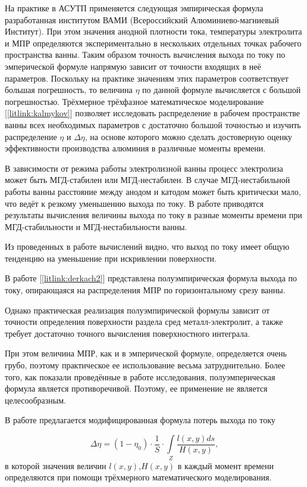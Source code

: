 \documentclass{article}
\begin{document}
На практике в АСУТП применяется следующая эмпирическая формула разработанная институтом ВАМИ (Всероссийский Алюминиево-магниевый Институт).
При этом значения анодной плотности тока, температуры электролита и МПР определяются экспериментально в нескольких отдельных точках рабочего пространства ванны.
Таким образом точность вычисления выхода по току по эмперической формуле напрямую зависит от точности входящих в неё параметров. Поскольку на практике значениям этих параметров соответствует большая погрешность, то величина $\eta$ по данной формуле вычисляется с большой погрешностью. Трёхмерное трёхфазное математическое моделирование [\ref{litlink:kalmykov}] позволяет исследовать распределение в рабочем пространстве ванны всех необходимых параметров с достаточно большой точностью и изучить распределение $\eta$ и $\Delta\eta$, на основе которого можно сделать достоверную оценку эффективности производства алюминия в различные моменты времени.

В зависимости от режима работы электролизной ванны процесс электролиза может быть МГД-стабилен или МГД-нестабилен. В случае МГД-нестабильной работы ванны расстояние между анодом и катодом может быть критически мало, что ведёт к резкому уменьшению выхода по току. В работе приводятся результаты вычисления величины выхода по току в разные моменты времени при МГД-стабильности и МГД-нестабильности ванны. 

Из проведенных в работе вычислений видно, что выход по току имеет общую тенденцию на уменьшение при искривлении поверхности. 

В работе [\ref{litlink:derkach2}] представлена полуэмпирическая формула выхода по току, опирающаяся на распределения МПР по горизонтальному срезу ванны.

Однако практическая реализация полуэмпирической формулы зависит от точности определения поверхности раздела сред металл-электролит, а также требует достаточно точного вычисления поверхностного интеграла. 

При этом величина МПР, как и в эмперической формуле, определяется очень грубо, поэтому практическое ее использование весьма затруднительно. Более того, как показали проведённые в работе исследования, полуэмперическая формула является противоречивой. Поэтому, ее применение не является целесообразным.

В работе предлагается модифицированная формула потерь выхода по току 

\begin{equation} \label{eq:modf2}
\Delta \eta = (1- \eta_0) \cdot \frac{1}{S} \cdot \int\limits_Z \frac{l(x,y) ds}{H(x,y)},
\end{equation}
в которой значения величин $l(x,y)$,$ H(x,y)$ в каждый момент времени определяются при помощи трёхмерного математического моделирования.
\end{document}
